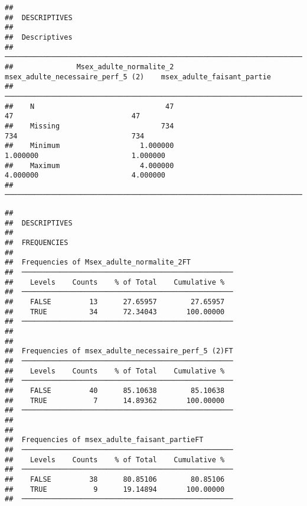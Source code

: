 \documentclass[
]{article}
\begin{document}
\begin{verbatim}
## 
##  DESCRIPTIVES
## 
##  Descriptives                                                                                              
##  ───────────────────────────────────────────────────────────────────────────────────────────────────────── 
##               Msex_adulte_normalite_2    msex_adulte_necessaire_perf_5 (2)    msex_adulte_faisant_partie   
##  ───────────────────────────────────────────────────────────────────────────────────────────────────────── 
##    N                               47                                   47                            47   
##    Missing                        734                                  734                           734   
##    Minimum                   1.000000                             1.000000                      1.000000   
##    Maximum                   4.000000                             4.000000                      4.000000   
##  ─────────────────────────────────────────────────────────────────────────────────────────────────────────
\end{verbatim}

\begin{verbatim}
## 
##  DESCRIPTIVES
## 
##  FREQUENCIES
## 
##  Frequencies of Msex_adulte_normalite_2FT           
##  ────────────────────────────────────────────────── 
##    Levels    Counts    % of Total    Cumulative %   
##  ────────────────────────────────────────────────── 
##    FALSE         13      27.65957        27.65957   
##    TRUE          34      72.34043       100.00000   
##  ────────────────────────────────────────────────── 
## 
## 
##  Frequencies of msex_adulte_necessaire_perf_5 (2)FT 
##  ────────────────────────────────────────────────── 
##    Levels    Counts    % of Total    Cumulative %   
##  ────────────────────────────────────────────────── 
##    FALSE         40      85.10638        85.10638   
##    TRUE           7      14.89362       100.00000   
##  ────────────────────────────────────────────────── 
## 
## 
##  Frequencies of msex_adulte_faisant_partieFT        
##  ────────────────────────────────────────────────── 
##    Levels    Counts    % of Total    Cumulative %   
##  ────────────────────────────────────────────────── 
##    FALSE         38      80.85106        80.85106   
##    TRUE           9      19.14894       100.00000   
##  ──────────────────────────────────────────────────
\end{verbatim}
\end{document}
